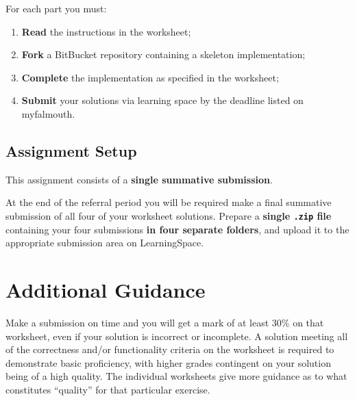 \documentclass{../../fal_assignment}
\begin{document}
For each part you must:
\begin{enumerate}[label=(\roman*)]
	\item \textbf{Read} the instructions in the worksheet;
	\item \textbf{Fork} a BitBucket repository containing a skeleton implementation;
	\item \textbf{Complete} the implementation as specified in the worksheet;
	\item \textbf{Submit} your solutions via learning space by the deadline listed on myfalmouth.
\end{enumerate}

\subsection*{Assignment Setup} 

This assignment consists of a \textbf{single summative submission}.

At the end of the referral period you will be required make a final summative submission of all four of your worksheet solutions.
Prepare a \textbf{single \texttt{.zip} file} containing your four submissions \textbf{in four separate folders}, and upload it to the appropriate submission area on LearningSpace.


\paragraph{}

\section*{Additional Guidance}

Make a submission on time and you will get a mark of at least 30\% on that worksheet,
even if your solution is incorrect or incomplete.
A solution meeting all of the correctness and/or functionality criteria on the worksheet is required to demonstrate basic proficiency,
with higher grades contingent on your solution being of a high quality.
The individual worksheets give more guidance as to what constitutes ``quality'' for that particular exercise.
\end{document}
